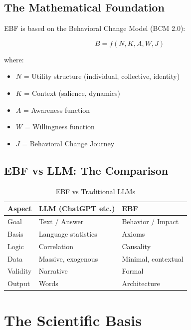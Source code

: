 \subsection{The Mathematical Foundation}

EBF is based on the Behavioral Change Model (BCM 2.0):

\begin{equation}
B = f(N, K, A, W, J)
\end{equation}

where:
\begin{itemize}[nosep]
\item $N$ = Utility structure (individual, collective, identity)
\item $K$ = Context (salience, dynamics)
\item $A$ = Awareness function
\item $W$ = Willingness function
\item $J$ = Behavioral Change Journey
\end{itemize}

\subsection{EBF vs LLM: The Comparison}

\begin{table}[htbp]
\centering
\caption{EBF vs Traditional LLMs}
\label{tab:ebf-vs-llm}
\renewcommand{\arraystretch}{1.3}
\begin{tabular}{@{}lll@{}}
\toprule
\textbf{Aspect} & \textbf{LLM (ChatGPT etc.)} & \textbf{EBF} \\
\midrule
Goal & Text / Answer & Behavior / Impact \\
Basis & Language statistics & Axioms \\
Logic & Correlation & Causality \\
Data & Massive, exogenous & Minimal, contextual \\
Validity & Narrative & Formal \\
Output & Words & Architecture \\
\bottomrule
\end{tabular}
\end{table}


\section{The Scientific Basis}
\label{sec:ref-ebf-science}

